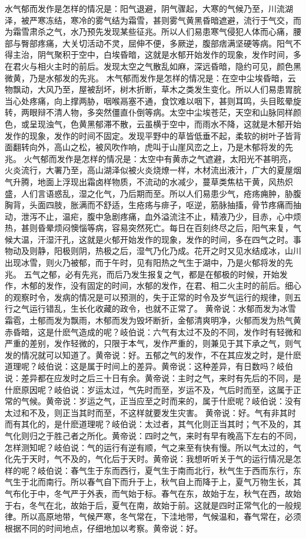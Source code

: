 \documentclass[12pt,UTF8]{ctexbook}
\begin{document}
水气郁而发作是怎样的情况是：阳气退避，阴气骤起，大寒的气候乃至，川流湖泽，被严寒冻结，寒冷的雾气结为霜雪，甚则雾气黄黑昏暗遮避，流行于气交，而为霜雪肃杀之气，水乃预先发现某些征兆。所以人们易患寒气侵犯人体而心痛，腰部与臀部疼痛，大关切活动不灵，屈伸不便，多厥逆，腹部痞满坚硬等病。阳气不得主治，阴气聚积于空中，白埃昏暗，这就是水郁开始发作的现象，发作时间，多在君火与相火主时的前后。发现太空之气散乱如麻，深远昏暗，隐约可见，颜色黑微黄，乃是水郁发的先兆。
木气郁而发作是怎样的情况是：在空中尘埃昏暗，云物飘动，大风乃至，屋被刮坏，树木折断，草木之类发生变化。所以人们易患胃脘当心处疼痛，向上撑两胁，咽喉鬲塞不通，食饮难以咽下，甚则耳鸣，头目眩晕旋转，两眼辩不清人物，多突然僵直仆倒等病。太空中尘埃苍茫，天空和山脉同样颜色，或呈现浊气，色黄黑郁滞不散，云虽横于空中，而雨水不降，这就是木郁开始发作的现象，发作的时间不固定。发现平野中的草皆低垂不起，柔软的树叶子皆背面翻转向外，高山之松，被风吹作响，虎叫于山崖风峦之上，乃是木郁将发的先兆。
火气郁而发作是怎样的情况是：太空中有黄赤之气遮避，太阳光不甚明亮，火炎流行，大署乃至，高山湖泽似被火炎烧燎一样，木材流出液汁，广大的夏屋烟气升腾，地面上浮现出霜卤样物质，不流动的水减少，蔓草类焦枯干黄，风热炽盛，人们言语惑乱，湿之化气，乃后期而至。所以人们易患少气，疮疡痈肿，胁腹胸背，头面四肢，胀满而不舒适，生疮疡与痱子，呕逆，筋脉抽搐，骨节疼痛而抽动，泄泻不止，温疟，腹中急剧疼痛，血外溢流注不止，精液乃少，目赤，心中烦热，甚则昏晕烦闷懊惱等病，容易突然死亡。每日在百刻终尽之后，阳气来复，气候大温，汗湿汗孔，这就是火郁开始发作的现象，发作的时间，多在四气之时。事物动及则静，阳极则阴，热极之后，湿气乃化乃成。花开之时又见水结成冰，山川出现冰雪，则火乃被郁，而于午时，见有阳热之气生于湖中，乃是火郁将发的先兆。
五气之郁，必有先兆，而后乃发生报复之气，都是在郁极的时候，开始发作，木郁的发作，没有固定的时间，水郁的发作，在君、相二火主时的前后。细心的观察时令，发病的情况是可以预测的，失于正常的时令及岁气运行的规律，则五行之气运行错乱，生长化收藏的政令，也就不正常了。
黄帝说：水郁而发为冰雪霜雹，土郁而发为飘雨，木郁而发为毁坏断折，金郁清爽明净，火郁而发为热气黄赤昏暗，这是什麽气造成的呢？岐伯说：六气有太过不及的不同，发作时有轻微和严重的差别，发作轻微的，只限于本气，发作严重的，则兼见于其下承之气，则气发的情况就可以知道了。黄帝说：好。五郁之气的发作，不在其应发之时，是什麽道理呢？岐伯说：这是属于时间上的差异。黄帝说：这种差异，有日数吗？岐伯说：差异都在应发时之后三十日有余。黄帝说：主时之气，来时有先后的不同，是什麽原因呢？岐伯说：岁运太过，气先时而至，岁运不及，气后时而至，这属于正常的气候。黄帝说：岁运之气，正当应至之时而来的，属于什麽呢？岐伯说：没有太过和不及，则正当其时而至，不这样就要发生灾害。
黄帝说：好。气有非其时而有其化的，是什麽道理呢？岐伯说：太过者，其气化则正当其时；气不及的，其气化则归之于胜己者之所化。黄帝说：四时之气，来时有早有晚高下左右的不同，怎样测知呢？岐伯说：气的运行有逆有顺，气之来至有快有慢。所以气太过的，气化先于天时，气不及的，气化后于天时。黄帝说：我想听听关于气的运行情况是怎样的呢？岐伯说：春气生于东而西行，夏气生于南而北行，秋气生于西而东行，东气生于北而南行。所以春气自下而升于上，秋气自上而降于上，夏气万物生长，其气布化于中，冬气严于外表，而气始于标。春气在东，故始于左，秋气在西，故始于右，冬气在北，故始于后，夏气在南，故始于前。这就是四时正常气化的一般规律。所以高原地带，气候严寒，冬气常在，下洼地带，气候温和，春气常在，必须根据不同的时间地点，仔细地加以考察。黄帝说：好。
\end{document}
